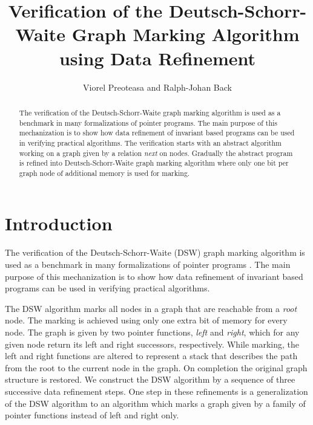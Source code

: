 \documentclass[11pt,a4paper]{article}
\begin{document}
\title{Verification of the Deutsch-Schorr-Waite Graph Marking Algorithm using Data Refinement}

\author{Viorel Preoteasa and Ralph-Johan Back}

\maketitle

\begin{abstract}
The verification of the Deutsch-Schorr-Waite graph marking algorithm is used as a 
benchmark in many formalizations of pointer programs. The main purpose of this 
mechanization is to show how data refinement of invariant based programs
can be used in verifying practical algorithms. The verification starts
with an abstract algorithm working on a graph given by a relation {\em next}
on nodes. Gradually the abstract program is refined into Deutsch-Schorr-Waite
graph marking algorithm where only one bit per graph node of additional memory
is used for marking. 
\end{abstract}

\tableofcontents

\section{Introduction}
The verification of the Deutsch-Schorr-Waite (DSW) \cite{schorr:waite:1967,knuth:1997} 
graph marking algorithm is used as a benchmark in many formalizations
of pointer programs \cite{mehta:nipkow:2003,Abrial:2003}. The main purpose of this 
mechanization is to show how data refinement \cite{preoteasa:back:2009} of invariant 
based programs \cite{Back80:invariants,Back83:invariants,aBack08,back:preoteasa:2008}
can be used in verifying practical algorithms.

The DSW algorithm marks all nodes in a graph that are reachable from a {\em root} node. 
The marking is achieved using only one extra bit of memory for every node. The 
graph is given by two pointer functions, {\em left} and {\em right}, which for any given 
node return its left and right successors, respectively. While marking, the 
left and right functions are altered to represent a stack that describes the 
path from the root to the current node in the graph. On completion the original 
graph structure is restored. We construct the DSW algorithm by a sequence of 
three successive data refinement steps. One step in these refinements is
a generalization of the DSW algorithm to an algorithm which marks a
graph given by a family of pointer functions instead of left and right only.
\end{document}
